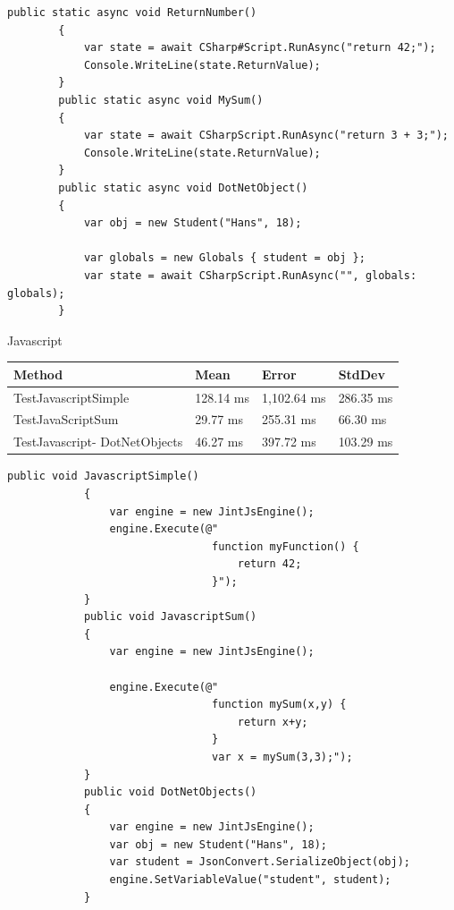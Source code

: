         \begin{lstlisting}[language={[Sharp]C}, caption=\#ScriptingTestMethods, label=lst:imp:cscm]
            public static async void ReturnNumber()
        {
            var state = await CSharp#Script.RunAsync("return 42;");
            Console.WriteLine(state.ReturnValue);
        }
        public static async void MySum()
        {
            var state = await CSharpScript.RunAsync("return 3 + 3;");
            Console.WriteLine(state.ReturnValue);
        }
        public static async void DotNetObject()
        {
            var obj = new Student("Hans", 18);

            var globals = new Globals { student = obj };
            var state = await CSharpScript.RunAsync("", globals: globals);
        }
        \end{lstlisting}
Javascript
     \begin{table}[H]
            \begin{tabular}{|p{3.5cm}|p{3cm}|p{3cm}|p{3cm}|}
            \hline
                Method & Mean & Error & StdDev \\ \hline
                TestJavascriptSimple & 128.14 ms & 1,102.64 ms & 286.35 ms  \\ \hline
                TestJavaScriptSum & 29.77 ms & 255.31 ms & 66.30 ms \\ \hline
                TestJavascript-
                DotNetObjects & 46.27 ms & 397.72 ms & 103.29 ms  \\ \hline
            \end{tabular}
        \end{table}

        \begin{lstlisting}[language={[Sharp]C}, caption=JavascriptTestMethods, label=lst:imp:jsm]
            public void JavascriptSimple()
            {
                var engine = new JintJsEngine();           
                engine.Execute(@"
                                function myFunction() {
                                    return 42;
                                }");           
            }
            public void JavascriptSum()
            {
                var engine = new JintJsEngine();
    
                engine.Execute(@"
                                function mySum(x,y) {
                                    return x+y;
                                }
                                var x = mySum(3,3);");
            }
            public void DotNetObjects()
            {
                var engine = new JintJsEngine();
                var obj = new Student("Hans", 18);
                var student = JsonConvert.SerializeObject(obj);
                engine.SetVariableValue("student", student);           
            }
        \end{lstlisting}



